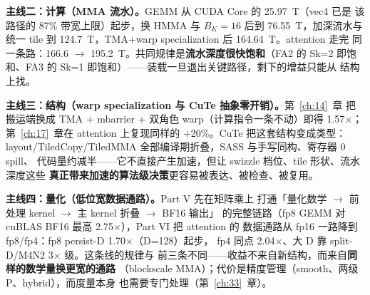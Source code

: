 \textbf{主线二：计算（MMA 流水）。}\allowbreak{}GEMM 从 CUDA Core 的 25.97~T（vec4 已是
该路径的 87\% 带宽上限）起步，换 HMMA 与 $B_K{=}16$ 后到 76.55~T，加深流水与
统一 tile 到 124.7~T，TMA+warp specialization 后 164.64~T。attention 走完
同一条路：166.6 $\to$ 195.2~T。共同规律是\textbf{流水深度很快饱和}（FA2 的
Sk=2 即饱和、FA3 的 Sk=1 即饱和）——装载一旦退出关键路径，剩下的增益只能从
结构上找。

\textbf{主线三：结构（warp specialization 与 CuTe 抽象零开销）。}第~\ref{ch:14}~章
把搬运端换成 TMA + mbarrier + 双角色 warp（计算指令一条不动）即得 1.57$\times$；
第~\ref{ch:17}~章在 attention 上复现同样的 +20\%。CuTe 把这套结构变成类型：
layout/TiledCopy/TiledMMA 全部编译期折叠，SASS 与手写同构、寄存器 0 spill、
代码量约减半——它不直接产生加速，但让 swizzle 档位、tile 形状、流水深度这些
\textbf{真正带来加速的算法级决策}更容易被表达、被检查、被复用。

\textbf{主线四：量化（低位宽数据通路）。}\allowbreak{}Part V 先在矩阵乘上
打通「量化数学 $\to$ 前处理 kernel $\to$ 主 kernel 折叠 $\to$ BF16 输出」
的完整链路（fp8 GEMM 对 cuBLAS BF16 最高 2.75$\times$），Part VI 把
attention 的
数据通路从 fp16 一路降到 fp8/fp4：fp8 persist-D 1.70$\times$（D=128）起步，
fp4 同点 2.04$\times$、大 D 靠 split-D/M4N2 3$\times$ 级。这条线的规律与
前三条不同——收益不来自新结构，而来自\textbf{同样的数学量换更宽的通路}
（blockscale MMA）；代价是精度管理（smooth、两级 P、hybrid），而度量本身
也需要专门处理（第~\ref{ch:33}~章）。
